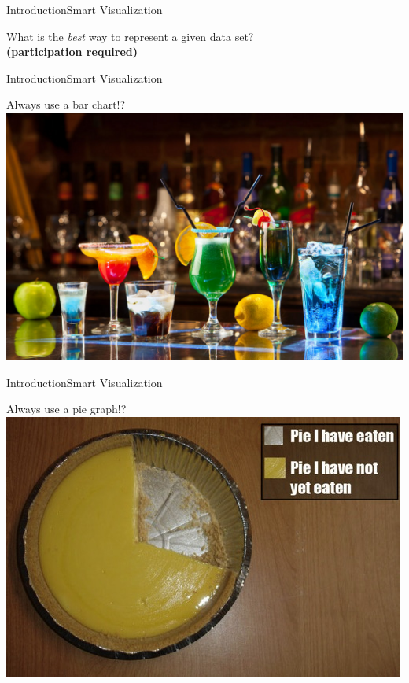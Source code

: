 \begin{frame}{Introduction}{Smart Visualization}
  \begin{center}
      What is the \textit{best} way to represent a given data set? \\
      \textbf{(participation required)}
  \end{center}
  \end{frame}

\begin{frame}{Introduction}{Smart Visualization}
  \begin{center}
      Always use a bar chart!?
      \includegraphics[scale=0.15]{images/bar.pdf}
  \end{center}
  \end{frame}

\begin{frame}{Introduction}{Smart Visualization}
  \begin{center}
      Always use a pie graph!?
      \includegraphics[scale=0.45]{images/pie.pdf}
  \end{center}
  \end{frame}


